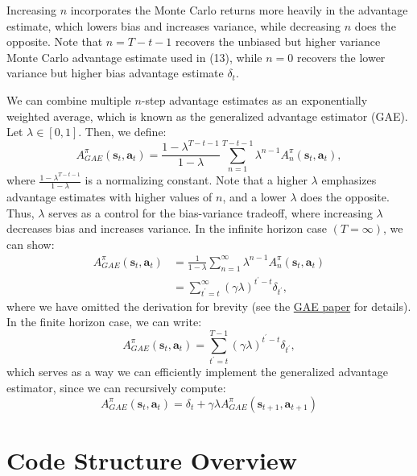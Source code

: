 \documentclass{article}
\def\rva{{\mathbf{a}}}
\def\rvs{{\mathbf{s}}}
\begin{document}
Increasing $n$ incorporates the Monte Carlo returns more heavily in the advantage estimate, which lowers bias and increases variance, while decreasing $n$ does the opposite. Note that $n=T-t-1$ recovers the unbiased but higher variance Monte Carlo advantage estimate used in (13), while $n=0$ recovers the lower variance but higher bias advantage estimate $\delta_{t}$.

We can combine multiple $n$-step advantage estimates as an exponentially weighted average, which is known as the generalized advantage estimator (GAE). Let $\lambda \in[0,1]$. Then, we define:
\begin{equation}
    A_{GAE}^{\pi}\left(\rvs_{t}, \rva_{t}\right)=\frac{1-\lambda^{T-t-1}}{1-\lambda} \sum_{n=1}^{T-t-1} \lambda^{n-1} A_{n}^{\pi}\left(\rvs_{t}, \rva_{t}\right),
\end{equation}
where $\frac{1-\lambda^{T-t-1}}{1-\lambda}$ is a normalizing constant. Note that a higher $\lambda$ emphasizes advantage estimates with higher values of $n$, and a lower $\lambda$ does the opposite. Thus, $\lambda$ serves as a control for the bias-variance tradeoff, where increasing $\lambda$ decreases bias and increases variance. In the infinite horizon case $(T=\infty)$, we can show:
\begin{align*}
    A_{GAE}^{\pi}\left(\rvs_{t}, \rva_{t}\right) & =\frac{1}{1-\lambda} \sum_{n=1}^{\infty} \lambda^{n-1} A_{n}^{\pi}\left(\rvs_{t}, \rva_{t}\right) \\
& =\sum_{t^{\prime}=t}^{\infty}(\gamma \lambda)^{t^{\prime}-t} \delta_{t^{\prime}},
\end{align*}
where we have omitted the derivation for brevity (see the \href{https://arxiv.org/pdf/1506.02438.pdf}{GAE paper} for details). In the finite horizon case, we can write:
\begin{equation}
    A_{GAE}^{\pi}\left(\rvs_{t}, \rva_{t}\right)=\sum_{t^{\prime}=t}^{T-1}(\gamma \lambda)^{t^{\prime}-t} \delta_{t^{\prime}},
\end{equation}
which serves as a way we can efficiently implement the generalized advantage estimator, since we can recursively compute:
\begin{equation}
    A_{GAE}^{\pi}\left(\rvs_{t}, \rva_{t}\right)=\delta_{t}+\gamma \lambda A_{GAE}^{\pi}\left(\rvs_{t+1}, \rva_{t+1}\right)
\end{equation}

\section{Code Structure Overview}
\end{document}
